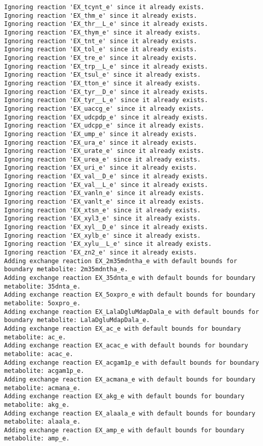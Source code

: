 \documentclass[
  letterpaper,
  DIV=11,
  numbers=noendperiod]{scrartcl}
\begin{document}
\begin{verbatim}
Ignoring reaction 'EX_tcynt_e' since it already exists.
Ignoring reaction 'EX_thm_e' since it already exists.
Ignoring reaction 'EX_thr__L_e' since it already exists.
Ignoring reaction 'EX_thym_e' since it already exists.
Ignoring reaction 'EX_tnt_e' since it already exists.
Ignoring reaction 'EX_tol_e' since it already exists.
Ignoring reaction 'EX_tre_e' since it already exists.
Ignoring reaction 'EX_trp__L_e' since it already exists.
Ignoring reaction 'EX_tsul_e' since it already exists.
Ignoring reaction 'EX_tton_e' since it already exists.
Ignoring reaction 'EX_tyr__D_e' since it already exists.
Ignoring reaction 'EX_tyr__L_e' since it already exists.
Ignoring reaction 'EX_uaccg_e' since it already exists.
Ignoring reaction 'EX_udcpdp_e' since it already exists.
Ignoring reaction 'EX_udcpp_e' since it already exists.
Ignoring reaction 'EX_ump_e' since it already exists.
Ignoring reaction 'EX_ura_e' since it already exists.
Ignoring reaction 'EX_urate_e' since it already exists.
Ignoring reaction 'EX_urea_e' since it already exists.
Ignoring reaction 'EX_uri_e' since it already exists.
Ignoring reaction 'EX_val__D_e' since it already exists.
Ignoring reaction 'EX_val__L_e' since it already exists.
Ignoring reaction 'EX_vanln_e' since it already exists.
Ignoring reaction 'EX_vanlt_e' since it already exists.
Ignoring reaction 'EX_xtsn_e' since it already exists.
Ignoring reaction 'EX_xyl3_e' since it already exists.
Ignoring reaction 'EX_xyl__D_e' since it already exists.
Ignoring reaction 'EX_xylb_e' since it already exists.
Ignoring reaction 'EX_xylu__L_e' since it already exists.
Ignoring reaction 'EX_zn2_e' since it already exists.
Adding exchange reaction EX_2m35mdntha_e with default bounds for boundary metabolite: 2m35mdntha_e.
Adding exchange reaction EX_35dnta_e with default bounds for boundary metabolite: 35dnta_e.
Adding exchange reaction EX_5oxpro_e with default bounds for boundary metabolite: 5oxpro_e.
Adding exchange reaction EX_LalaDgluMdapDala_e with default bounds for boundary metabolite: LalaDgluMdapDala_e.
Adding exchange reaction EX_ac_e with default bounds for boundary metabolite: ac_e.
Adding exchange reaction EX_acac_e with default bounds for boundary metabolite: acac_e.
Adding exchange reaction EX_acgam1p_e with default bounds for boundary metabolite: acgam1p_e.
Adding exchange reaction EX_acmana_e with default bounds for boundary metabolite: acmana_e.
Adding exchange reaction EX_akg_e with default bounds for boundary metabolite: akg_e.
Adding exchange reaction EX_alaala_e with default bounds for boundary metabolite: alaala_e.
Adding exchange reaction EX_amp_e with default bounds for boundary metabolite: amp_e.

\end{verbatim}
\end{document}
